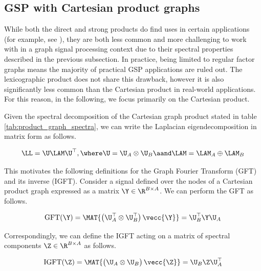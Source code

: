 

\subsection{GSP with Cartesian product graphs}

While both the direct and strong products do find uses in certain applications (for example, see \citep{Kaveh2011}), they are both less common and more challenging to work with in a graph signal processing context due to their spectral properties described in the previous subsection. In practice, being limited to regular factor graphs means the majority of practical GSP applications are ruled out. The lexicographic product does not share this drawback, however it is also significantly less common than the Cartesian product in real-world applications. For this reason, in the following, we focus primarily on the Cartesian product.

Given the spectral decomposition of the Cartesian graph product stated in table \ref{tab:product_graph_spectra}, we can write the Laplacian eigendecomposition in matrix form as follows.

\begin{equation}
    \LL = \U \LAM \U^\top, \where \U = \U_A \otimes \U_B \aand \LAM = \LAM_A \oplus \LAM_B
\end{equation}

This motivates the following definitions for the Graph Fourier Transform (GFT) and its inverse (IGFT). Consider a signal defined over the nodes of a Cartesian product graph expressed as a matrix $\Y \in \R^{B \times A}$. We can perform the GFT as follows.



\begin{equation}
    \text{GFT}(\Y) = \MAT{\big( \U_A^\top \otimes \U_B^\top \big) \, \vecc{\Y}} = \U_B^\top \Y \U_A
\end{equation}

Correspondingly, we can define the IGFT acting on a matrix of spectral components $\Z \in \R^{B \times A}$ as follows.

\begin{equation}
    \text{IGFT}(\Z) = \MAT{\big( \U_A \otimes \U_B \big)\,\vecc{\Z}} = \U_B \Z \U_A^\top
\end{equation}


